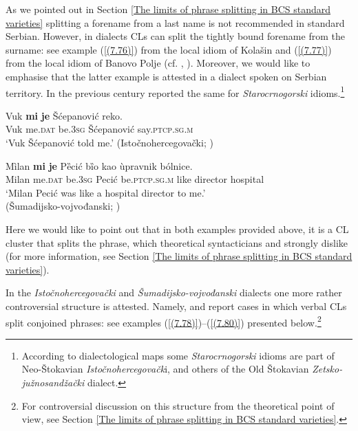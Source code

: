 \noindent As we pointed out in Section \ref{The limits of phrase splitting in BCS standard varieties} splitting a forename from a last name is not recommended in standard Serbian. However, in dialects CLs can split the tightly bound forename from the surname: see example (\ref{(7.76)}) from the local idiom of Kolašin and (\ref{(7.77)}) from the local idiom of Banovo Polje (cf. \citealt[67]{Okuka08}, \citealt[279]{Nikolic66}). Moreover, we would like to emphasise that the latter example is attested in a dialect spoken on Serbian territory. In the previous century \citet[209]{Pesikan65} reported the same for \textit{Starocrnogorski} idioms.\footnote{According to dialectological maps some \textit{Starocrnogorski} idioms are part of Neo-Štokavian \textit{Istočnohercegovačk}i, and others of the Old Štokavian \textit{Zetsko-južnosandžački} dialect.}

\begin{exe}\ex\label{(7.76)}
\gll Vuk  \textbf{mi}  \textbf{je}  Šćepanović  reko. \\
Vuk me.\textsc{dat}  be.3\textsc{sg}  Šćepanović  say.\textsc{ptcp.sg.m} \\
\glt ‘Vuk Šćepanović told me.’
\hfill  (Istočnohercegovački; \citealt[67]{Okuka08})

\ex\label{(7.77)}
\gll Mìlan  \textbf{mi}  \textbf{je}  Pȅcić  bȉo  kao  ùpravnik  bólnice. \\
Milan me.\textsc{dat} be.3\textsc{sg} Pecić be.\textsc{ptcp.sg.m} like director hospital \\
\glt ‘Milan Pecić was like a hospital director to me.’ \\
\hfill  (Šumadijsko-vojvođanski; \citealt[279]{Nikolic66})
\end{exe}

\noindent Here we would like to point out that in both examples provided above, it is a CL cluster that splits the phrase, which theoretical syntacticians \citet{Progovac96} and \citet{RadanovicKocic96} strongly dislike (for more information, see Section \ref{The limits of phrase splitting in BCS standard varieties}).

In the \textit{Istočnohercegovački} and \textit{Šumadijsko-vojvođanski} dialects one more rather controversial structure is attested. Namely, \citet[67, 74]{Okuka08} and \citet[209]{Pesikan65} report cases in which verbal CLs split conjoined phrases: see examples (\ref{(7.78)})--(\ref{(7.80)}) presented below.\footnote{For controversial discussion on this structure from the theoretical point of view, see Section \ref{The limits of phrase splitting in BCS standard varieties}.}

